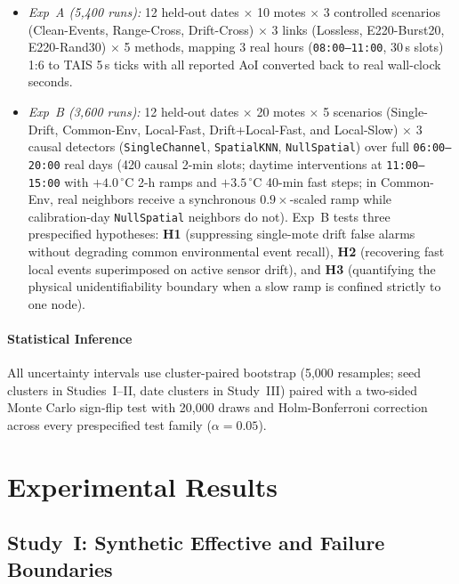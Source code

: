 \documentclass[journal,twoside,web]{ieeecolor}
\begin{document}
\begin{enumerate}
\begin{itemize}
\item \textit{Exp~A (5,400 runs):} 12 held-out dates $\times$ 10 motes $\times$ 3 controlled scenarios (Clean-Events, Range-Cross, Drift-Cross) $\times$ 3 links (Lossless, E220-Burst20, E220-Rand30) $\times$ 5 methods, mapping 3 real hours (\texttt{08:00--11:00}, 30\,s slots) 1:6 to TAIS 5\,s ticks with all reported AoI converted back to real wall-clock seconds.
\item \textit{Exp~B (3,600 runs):} 12 held-out dates $\times$ 20 motes $\times$ 5 scenarios (Single-Drift, Common-Env, Local-Fast, Drift+Local-Fast, and Local-Slow) $\times$ 3 causal detectors (\texttt{SingleChannel}, \texttt{SpatialKNN}, \texttt{NullSpatial}) over full \texttt{06:00--20:00} real days (420 causal 2-min slots; daytime interventions at \texttt{11:00--15:00} with $+4.0\,^{\circ}\text{C}$ 2-h ramps and $+3.5\,^{\circ}\text{C}$ 40-min fast steps; in Common-Env, real neighbors receive a synchronous $0.9\times$-scaled ramp while calibration-day \texttt{NullSpatial} neighbors do not). Exp~B tests three prespecified hypotheses: \textbf{H1} (suppressing single-mote drift false alarms without degrading common environmental event recall), \textbf{H2} (recovering fast local events superimposed on active sensor drift), and \textbf{H3} (quantifying the physical unidentifiability boundary when a slow ramp is confined strictly to one node).
\end{itemize}
\end{enumerate}

\paragraph{Statistical Inference}
All uncertainty intervals use cluster-paired bootstrap (5,000 resamples; seed clusters in Studies~I--II, date clusters in Study~III) paired with a two-sided Monte Carlo sign-flip test with 20,000 draws and Holm-Bonferroni correction~\cite{holm1979simple} across every prespecified test family ($\alpha = 0.05$).

\section{Experimental Results}

\subsection{Study~I: Synthetic Effective and Failure Boundaries}
\end{document}
